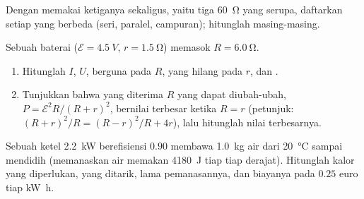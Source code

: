 \begin{exercise}[$\star\star\star$]\label{exo:g11:circuits-and-power:12}
Dengan memakai ketiganya sekaligus, yaitu tiga  \qty{60}{\ohm}
yang serupa, daftarkan setiap  yang berbeda (seri,
paralel, campuran); hitunglah masing-masing.
\end{exercise}

\begin{exercise}[$\star\star\star$]\label{exo:g11:circuits-and-power:13}
Sebuah baterai ($\mathcal{E} = \qty{4.5}{V}$, $r = \qty{1.5}{\ohm}$)
memasok  $R = \qty{6.0}{\ohm}$.
\begin{enumerate}
  \item Hitunglah $I$, $U$,  berguna pada $R$,  yang hilang
        pada $r$, dan .
  \item Tunjukkan bahwa  yang diterima $R$ yang dapat diubah-ubah,
        $P = \mathcal{E}^2 R/(R+r)^2$, bernilai terbesar ketika
        $R = r$ (petunjuk: $(R+r)^2/R = (R-r)^2/R + 4r$), lalu
        hitunglah nilai terbesarnya.
\end{enumerate}
\end{exercise}

\begin{exercise}[$\star\star\star$]\label{exo:g11:circuits-and-power:14}
Sebuah ketel \qty{2.2}{kW} berefisiensi $0.90$ membawa \qty{1.0}{kg} air
dari \qty{20}{\degreeCelsius} sampai mendidih (memanaskan air memakan
\qty{4180}{J} tiap  tiap derajat). Hitunglah kalor yang
diperlukan,  yang ditarik, lama pemanasannya, dan biayanya
pada $0.25$ euro tiap \unit{kW.h}.
\end{exercise}

